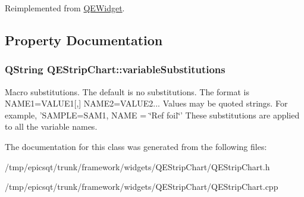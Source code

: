Reimplemented from \hyperlink{classQEWidget_a661ceaf355404437497e21c9db4cb110}{QEWidget}.



\subsection{Property Documentation}
\hypertarget{classQEStripChart_ac64f59db46f9c03b3c83e3578458c17b}{
\subsubsection[{variableSubstitutions}]{\setlength{\rightskip}{0pt plus 5cm}QString QEStripChart::variableSubstitutions}}
\label{classQEStripChart_ac64f59db46f9c03b3c83e3578458c17b}
Macro substitutions. The default is no substitutions. The format is NAME1=VALUE1\mbox{[},\mbox{]} NAME2=VALUE2... Values may be quoted strings. For example, 'SAMPLE=SAM1, NAME = \char`\"{}Ref foil\char`\"{}' These substitutions are applied to all the variable names. 

The documentation for this class was generated from the following files:\begin{DoxyCompactItemize}
\item 
/tmp/epicsqt/trunk/framework/widgets/QEStripChart/QEStripChart.h\item 
/tmp/epicsqt/trunk/framework/widgets/QEStripChart/QEStripChart.cpp\end{DoxyCompactItemize}
